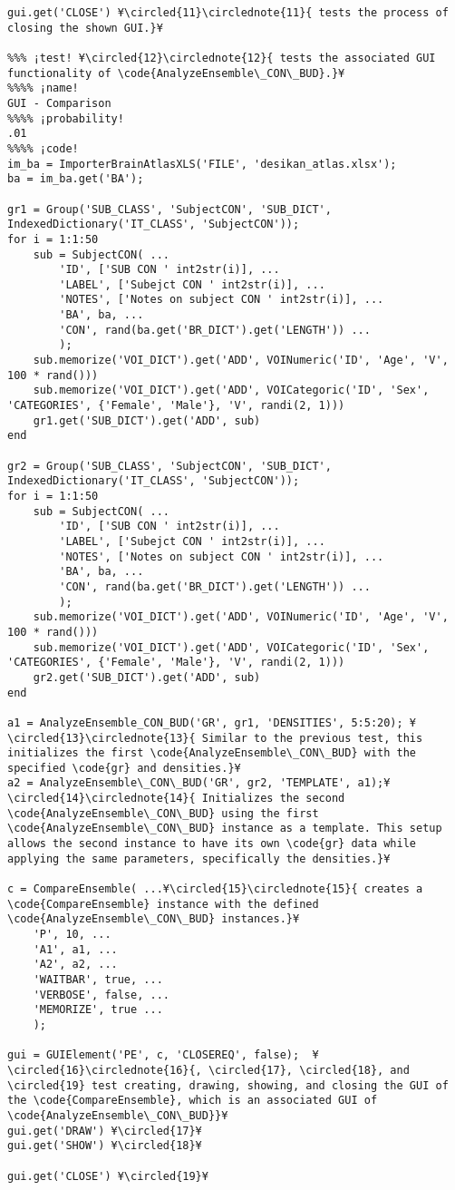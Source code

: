 \documentclass{tufte-handout}
\begin{document}
\begin{lstlisting}
gui.get('CLOSE') ¥\circled{11}\circlednote{11}{ tests the process of closing the shown GUI.}¥

%%% ¡test! ¥\circled{12}\circlednote{12}{ tests the associated GUI functionality of \code{AnalyzeEnsemble\_CON\_BUD}.}¥
%%%% ¡name!
GUI - Comparison
%%%% ¡probability!
.01
%%%% ¡code!
im_ba = ImporterBrainAtlasXLS('FILE', 'desikan_atlas.xlsx');
ba = im_ba.get('BA');

gr1 = Group('SUB_CLASS', 'SubjectCON', 'SUB_DICT', IndexedDictionary('IT_CLASS', 'SubjectCON'));
for i = 1:1:50
    sub = SubjectCON( ...
        'ID', ['SUB CON ' int2str(i)], ...
        'LABEL', ['Subejct CON ' int2str(i)], ...
        'NOTES', ['Notes on subject CON ' int2str(i)], ...
        'BA', ba, ...
        'CON', rand(ba.get('BR_DICT').get('LENGTH')) ...
        );
    sub.memorize('VOI_DICT').get('ADD', VOINumeric('ID', 'Age', 'V', 100 * rand()))
    sub.memorize('VOI_DICT').get('ADD', VOICategoric('ID', 'Sex', 'CATEGORIES', {'Female', 'Male'}, 'V', randi(2, 1)))
    gr1.get('SUB_DICT').get('ADD', sub)
end

gr2 = Group('SUB_CLASS', 'SubjectCON', 'SUB_DICT', IndexedDictionary('IT_CLASS', 'SubjectCON'));
for i = 1:1:50
    sub = SubjectCON( ...
        'ID', ['SUB CON ' int2str(i)], ...
        'LABEL', ['Subejct CON ' int2str(i)], ...
        'NOTES', ['Notes on subject CON ' int2str(i)], ...
        'BA', ba, ...
        'CON', rand(ba.get('BR_DICT').get('LENGTH')) ...
        );
    sub.memorize('VOI_DICT').get('ADD', VOINumeric('ID', 'Age', 'V', 100 * rand()))
    sub.memorize('VOI_DICT').get('ADD', VOICategoric('ID', 'Sex', 'CATEGORIES', {'Female', 'Male'}, 'V', randi(2, 1)))
    gr2.get('SUB_DICT').get('ADD', sub)
end

a1 = AnalyzeEnsemble_CON_BUD('GR', gr1, 'DENSITIES', 5:5:20); ¥\circled{13}\circlednote{13}{ Similar to the previous test, this initializes the first \code{AnalyzeEnsemble\_CON\_BUD} with the specified \code{gr} and densities.}¥
a2 = AnalyzeEnsemble\_CON\_BUD('GR', gr2, 'TEMPLATE', a1);¥\circled{14}\circlednote{14}{ Initializes the second \code{AnalyzeEnsemble\_CON\_BUD} using the first \code{AnalyzeEnsemble\_CON\_BUD} instance as a template. This setup allows the second instance to have its own \code{gr} data while applying the same parameters, specifically the densities.}¥

c = CompareEnsemble( ...¥\circled{15}\circlednote{15}{ creates a \code{CompareEnsemble} instance with the defined \code{AnalyzeEnsemble\_CON\_BUD} instances.}¥
    'P', 10, ...
    'A1', a1, ...
    'A2', a2, ...
    'WAITBAR', true, ...
    'VERBOSE', false, ...
    'MEMORIZE', true ...
    );

gui = GUIElement('PE', c, 'CLOSEREQ', false);  ¥\circled{16}\circlednote{16}{, \circled{17}, \circled{18}, and \circled{19} test creating, drawing, showing, and closing the GUI of the \code{CompareEnsemble}, which is an associated GUI of \code{AnalyzeEnsemble\_CON\_BUD}}¥
gui.get('DRAW') ¥\circled{17}¥
gui.get('SHOW') ¥\circled{18}¥

gui.get('CLOSE') ¥\circled{19}¥

\end{lstlisting}
\end{document}
